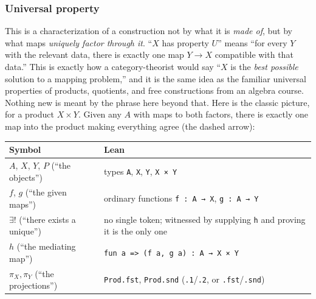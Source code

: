 \subsubsection{Universal property}\label{sec:02-terminology-and-coc:01-terminology:7}

This is a characterization of a construction not by what it is \emph{made of}, but by what maps \emph{uniquely factor through it}. ``\(X\) has property \(U\)'' means ``for every \(Y\) with the relevant data, there is exactly one map \(Y \to X\) compatible with that data.'' This is exactly how a category-theorist would say ``\(X\) is the \emph{best possible} solution to a mapping problem,'' and it is the same idea as the familiar universal properties of products, quotients, and free constructions from an algebra course. Nothing new is meant by the phrase here beyond that. Here is the classic picture, for a product \(X \times Y\). Given any \(A\) with maps to both factors, there is exactly one map into the product making everything agree (the dashed arrow):

\begin{center}

\end{center}

\begin{longtable}[]{@{}
  >{\raggedright\arraybackslash}p{}
  >{\raggedright\arraybackslash}p{}@{}}
\toprule\noalign{}
\begin{minipage}[b]{\linewidth}\raggedright
Symbol
\end{minipage} & \begin{minipage}[b]{\linewidth}\raggedright
Lean
\end{minipage} \\
\midrule\noalign{}
\endhead
\bottomrule\noalign{}
\endlastfoot
\(A\), \(X\), \(Y\), \(P\) (``the objects'') & types \texttt{A}, \texttt{X}, \texttt{Y}, \texttt{X × Y} \\
\(f\), \(g\) (``the given maps'') & ordinary functions \texttt{f : A → X}, \texttt{g : A → Y} \\
\(\exists!\) (``there exists a unique'') & no single token; witnessed by supplying \texttt{h} and proving it is the only one \\
\(h\) (``the mediating map'') & \texttt{fun a => (f a, g a) : A → X × Y} \\
\(\pi_X, \pi_Y\) (``the projections'') & \texttt{Prod.fst}, \texttt{Prod.snd} (\texttt{.1}/\texttt{.2}, or \texttt{.fst}/\texttt{.snd}) \\
\end{longtable}

